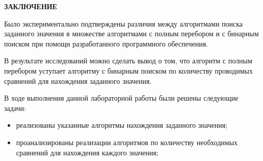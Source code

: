\begin{center}
    \textbf{ЗАКЛЮЧЕНИЕ}
\end{center}

Было экспериментально подтверждены различия между алгоритмами поиска заданного
значения в множестве алгоритмами с полным перебором и с бинарным поиском при помощи
разработанного программного обеспечения.

В результате исследований можно сделать вывод о том, что алгоритм с полным
перебором уступает алгоритму с бинарным поиском по количеству проводимых сравнений
для нахождения заданного значения.


\vspace{5mm}

В ходе выполнения данной лабораторной работы были решены следующие задачи:
\begin{itemize}
	\item реализованы указанные алгоритмы нахождения заданного значения;
        \item проанализированы реализации алгоритмов по количеству необходимых
            сравнений для нахождения каждого значения;
\end{itemize}

